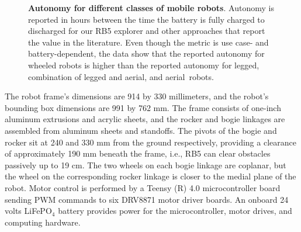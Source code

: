 \documentclass[letterpaper,10pt,conference,twoside]{IEEEtran}
\theoremstyle{definition}
\begin{document}
\begin{figure}[t]
  \vspace*{-.25cm}
  \begin{minipage}[t]{0.58\columnwidth}
    \hspace*{-.5cm}
    
  \end{minipage}\hfill
  \begin{minipage}[t]{0.41\columnwidth}
    \vspace*{-5.25cm}
    \centering
    \caption[Autonomy for different classes of mobile robots]{%
    \textbf{Autonomy for different classes of mobile robots}. 
    Autonomy is reported in hours between the time the battery is fully charged to discharged for our RB5 explorer and other approaches that report the value in the literature. Even though the metric is use case- and battery-dependent, the data show that the reported autonomy for wheeled robots is higher than the reported autonomy for legged, combination of legged and aerial, and aerial~robots.
    }
    \label{fig}
  \end{minipage}
  \vspace*{-1cm}
\end{figure}

The robot frame's dimensions are 914 by 330 millimeters, and the robot's bounding box dimensions are 991 by 762 mm. The frame consists of one-inch aluminum extrusions and acrylic sheets, and the rocker and bogie linkages are assembled from aluminum sheets and standoffs. The pivots of the bogie and rocker sit at 240 and 330 mm from the ground respectively, providing a clearance of approximately 190 mm beneath the frame, i.e., RB5 can clear obstacles passively up to 19 cm. The two wheels on each bogie linkage are coplanar, but the wheel on the corresponding rocker linkage is closer to the medial plane of the robot. Motor control is performed by a Teensy (R) 4.0 microcontroller board sending PWM commands to six DRV8871 motor driver boards. An onboard 24 volts LiFePO${}_\text{4}$ battery provides power for the microcontroller, motor drives, and computing hardware.
\end{document}
